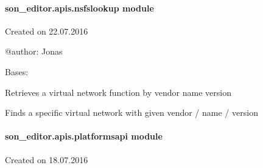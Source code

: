 \documentclass[letterpaper,10pt,english]{sphinxmanual}
\begin{document}
\paragraph{son\_editor.apis.nsfslookup module}
\label{_source/son_editor.apis:son-editor-apis-nsfslookup-module}\label{_source/son_editor.apis:module-son_editor.apis.nsfslookup}
Created on 22.07.2016

@author: Jonas

\begin{fulllineitems}
\label{_source/son_editor.apis:son_editor.apis.nsfslookup.Lookup}
Bases: 

\begin{fulllineitems}
\label{_source/son_editor.apis:son_editor.apis.nsfslookup.Lookup.get}
Retrieves a virtual network function by vendor name version

Finds a specific virtual network with given vendor / name / version

\end{fulllineitems}


\begin{fulllineitems}
\label{_source/son_editor.apis:son_editor.apis.nsfslookup.Lookup.methods}
\end{fulllineitems}


\end{fulllineitems}



\paragraph{son\_editor.apis.platformsapi module}
\label{_source/son_editor.apis:son-editor-apis-platformsapi-module}\label{_source/son_editor.apis:module-son_editor.apis.platformsapi}
Created on 18.07.2016
\end{document}
